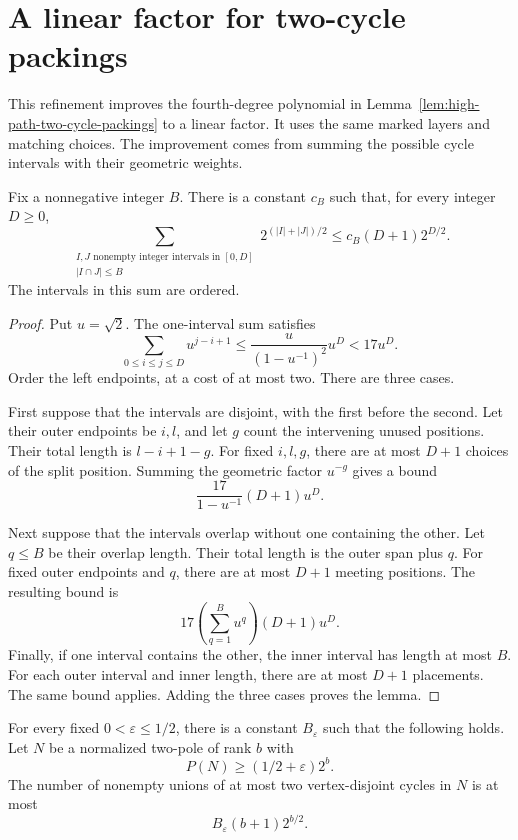 \section{A linear factor for two-cycle packings}
\label{sec:linear-two-cycle-packings}

This refinement improves the fourth-degree polynomial in Lemma~\ref{lem:high-path-two-cycle-packings} to a linear factor.
It uses the same marked layers and matching choices.
The improvement comes from summing the possible cycle intervals with their geometric weights.

\begin{lemma}
\label{lem:bounded-overlap-interval-sum}
Fix a nonnegative integer $B$.
There is a constant $c_B$ such that, for every integer $D\ge0$,
\[
 \sum_{\substack{I,J\text{ nonempty integer intervals in }[0,D]\\
                  |I\cap J|\le B}}
 2^{(|I|+|J|)/2}
 \le c_B(D+1)2^{D/2}.
\]
The intervals in this sum are ordered.
\end{lemma}

\begin{proof}
Put $u=\sqrt2$.
The one-interval sum satisfies
\[
 \sum_{0\le i\le j\le D}u^{j-i+1}
 \le\frac{u}{(1-u^{-1})^2}u^D<17u^D.
\]
Order the left endpoints, at a cost of at most two.
There are three cases.

First suppose that the intervals are disjoint, with the first before the second.
Let their outer endpoints be $i,l$, and let $g$ count the intervening unused positions.
Their total length is $l-i+1-g$.
For fixed $i,l,g$, there are at most $D+1$ choices of the split position.
Summing the geometric factor $u^{-g}$ gives a bound
\[
 \frac{17}{1-u^{-1}}(D+1)u^D.
\]

Next suppose that the intervals overlap without one containing the other.
Let $q\le B$ be their overlap length.
Their total length is the outer span plus $q$.
For fixed outer endpoints and $q$, there are at most $D+1$ meeting positions.
The resulting bound is
\[
 17\left(\sum_{q=1}^{B}u^q\right)(D+1)u^D.
\]
Finally, if one interval contains the other, the inner interval has length at most $B$.
For each outer interval and inner length, there are at most $D+1$ placements.
The same bound applies.
Adding the three cases proves the lemma.
\end{proof}

\begin{theorem}
\label{thm:linear-high-path-two-cycle-packings}
For every fixed $0<\varepsilon\le1/2$, there is a constant $B_\varepsilon$ such that the following holds.
Let $N$ be a normalized two-pole of rank $b$ with
\[
 P(N)\ge(1/2+\varepsilon)2^b.
\]
The number of nonempty unions of at most two vertex-disjoint cycles in $N$ is at most
\[
 B_\varepsilon(b+1)2^{b/2}.
\]
\end{theorem}


